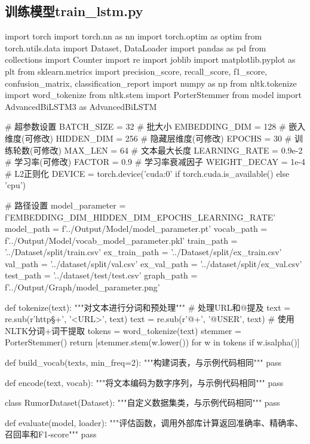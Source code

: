 \subsection{训练模型train\_lstm.py}
\begin{codeblock}[language=Python]
import torch
import torch.nn as nn
import torch.optim as optim
from torch.utils.data import Dataset, DataLoader
import pandas as pd
from collections import Counter
import re
import joblib
import matplotlib.pyplot as plt
from sklearn.metrics import precision_score, recall_score, f1_score, confusion_matrix, classification_report
import numpy as np
from nltk.tokenize import word_tokenize
from nltk.stem import PorterStemmer
from model import AdvancedBiLSTM3 as AdvancedBiLSTM

# 超参数设置
BATCH_SIZE = 32         # 批大小
EMBEDDING_DIM = 128     # 嵌入维度(可修改)
HIDDEN_DIM = 256        # 隐藏层维度(可修改)
EPOCHS = 30             # 训练轮数(可修改)
MAX_LEN = 64            # 文本最大长度
LEARNING_RATE = 0.9e-2  # 学习率(可修改)
FACTOR = 0.9            # 学习率衰减因子
WEIGHT_DECAY = 1e-4     # L2正则化
DEVICE = torch.device('cuda:0' if torch.cuda.is_available() else 'cpu') 

# 路径设置
model_parameter = f'{EMBEDDING_DIM}_{HIDDEN_DIM}_{EPOCHS}_{LEARNING_RATE}'
model_path = f'../Output/Model/{model_parameter}.pt'
vocab_path = f'../Output/Model/vocab_{model_parameter}.pkl'
train_path = '../Dataset/split/train.csv'
ex_train_path = '../Dataset/split/ex_train.csv'
val_path = '../dataset/split/val.csv'
ex_val_path = '../dataset/split/ex_val.csv'
test_path = '../dataset/test/test.csv'
graph_path = f'../Output/Graph/{model_parameter}.png'

def tokenize(text):
    """对文本进行分词和预处理"""
    # 处理URL和@提及
    text = re.sub(r'http\S+', '<URL>', text)
    text = re.sub(r'@\w+', '@USER', text)
    # 使用NLTK分词+词干提取
    tokens = word_tokenize(text)
    stemmer = PorterStemmer()
    return [stemmer.stem(w.lower()) for w in tokens if w.isalpha()]

def build_vocab(texts, min_freq=2):
    """构建词表，与示例代码相同"""
    pass

def encode(text, vocab):
    """将文本编码为数字序列，与示例代码相同"""
    pass

class RumorDataset(Dataset):
    """自定义数据集类，与示例代码相同"""
    pass
    
def evaluate(model, loader):
    """评估函数，调用外部库计算返回准确率、精确率、召回率和F1-score"""
    pass


\end{codeblock}
